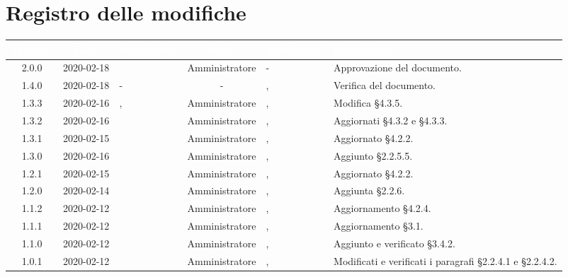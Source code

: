\section*{Registro delle modifiche}
{
\renewcommand{\arraystretch}{1.5}
\centering
\begin{longtable}{ c c  C{2.5cm} c C{3cm} C{3.5cm}}
\textcolor{white}{\textbf{Versione}}&
\textcolor{white}{\textbf{Data}}&
\textcolor{white}{\textbf{Nominativo}}&
\textcolor{white}{\textbf{Ruolo}}&
\textcolor{white}{\textbf{Verificatore}}&
\textcolor{white}{\textbf{Descrizione}}\\	
\endhead

2.0.0 & 2020-02-18 & \LD{} & Amministratore & - & Approvazione del documento.  \\

1.4.0 & 2020-02-18 & - & - & \CE{}, \MC{} & Verifica del documento.  \\ 

1.3.3 & 2020-02-16 & \DF{}, \PF{} & Amministratore & \CE{}, \MC{} & Modifica §4.3.5. \\

1.3.2 & 2020-02-16 & \SE{} & Amministratore & \CE{}, \MC{} & Aggiornati §4.3.2 e §4.3.3. \\

1.3.1 & 2020-02-15 & \SE{} & Amministratore & \CE{}, \MC{} & Aggiornato §4.2.2. \\

1.3.0 & 2020-02-16 & \SE{} & Amministratore & \CE{}, \MC{} & Aggiunto §2.2.5.5. \\

1.2.1 & 2020-02-15 & \SE{} & Amministratore & \CE{}, \MC{} & Aggiornato §4.2.2. \\

1.2.0 & 2020-02-14 & \SE{} & Amministratore & \CE{}, \MC{} & Aggiunta §2.2.6. \\

1.1.2 & 2020-02-12 & \SE{} & Amministratore & \CE{}, \MC{} & Aggiornamento §4.2.4. \\ 

1.1.1 & 2020-02-12 & \BR{} & Amministratore & \CE{}, \MC{} & Aggiornamento §3.1. \\ 

1.1.0 & 2020-02-12 & \BR{} & Amministratore & \CE{}, \MC{} & Aggiunto e verificato §3.4.2. \\

1.0.1 & 2020-02-12 & \SE{} & Amministratore & \CE{}, \MC{} & Modificati e verificati i paragrafi §2.2.4.1 e §2.2.4.2. \\ 


\end{longtable}}
